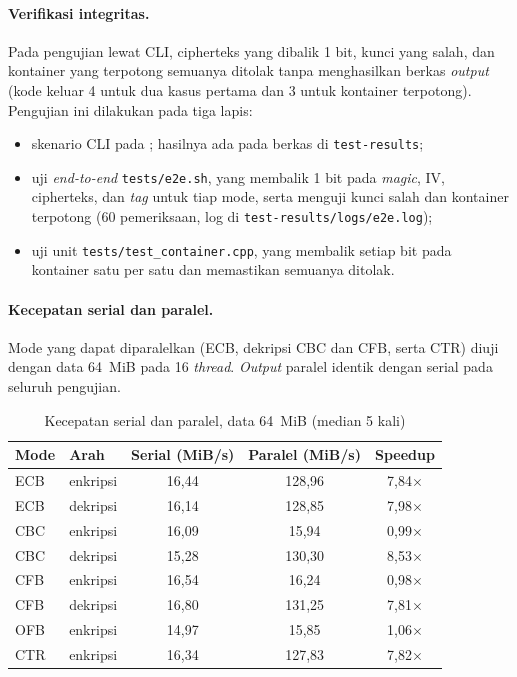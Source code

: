 \paragraph{Verifikasi integritas.} Pada pengujian lewat CLI, cipherteks yang dibalik 1 bit, kunci
yang salah, dan kontainer yang terpotong semuanya ditolak tanpa menghasilkan berkas \textit{output}
(kode keluar 4 untuk dua kasus pertama dan 3 untuk kontainer terpotong). Pengujian ini dilakukan
pada tiga lapis:
\begin{itemize}
  \item skenario CLI pada ; hasilnya ada pada berkas
     di \texttt{test-results};
  \item uji \textit{end-to-end} \texttt{tests/e2e.sh}, yang membalik 1 bit pada \textit{magic}, IV,
    cipherteks, dan \textit{tag} untuk tiap mode, serta menguji kunci salah dan kontainer terpotong
    (60 pemeriksaan, log di \texttt{test-results/logs/e2e.log});
  \item uji unit \texttt{tests/test\_container.cpp}, yang membalik setiap bit pada kontainer satu
    per satu dan memastikan semuanya ditolak.
\end{itemize}

\paragraph{Kecepatan serial dan paralel.} Mode yang dapat diparalelkan (ECB, dekripsi CBC dan CFB,
serta CTR) diuji dengan data 64~MiB pada 16 \textit{thread}. \textit{Output} paralel identik dengan serial
pada seluruh pengujian.

\begin{table}[H]
  \centering
  \caption{Kecepatan serial dan paralel, data 64~MiB (median 5 kali)}
  \begin{tabular}{llccc}
    \toprule
    Mode & Arah & Serial (MiB/s) & Paralel (MiB/s) & Speedup \\
    \midrule
    ECB & enkripsi & 16,44 & 128,96 & 7,84$\times$ \\
    ECB & dekripsi & 16,14 & 128,85 & 7,98$\times$ \\
    CBC & enkripsi & 16,09 & 15,94 & 0,99$\times$ \\
    CBC & dekripsi & 15,28 & 130,30 & 8,53$\times$ \\
    CFB & enkripsi & 16,54 & 16,24 & 0,98$\times$ \\
    CFB & dekripsi & 16,80 & 131,25 & 7,81$\times$ \\
    OFB & enkripsi & 14,97 & 15,85 & 1,06$\times$ \\
    CTR & enkripsi & 16,34 & 127,83 & 7,82$\times$ \\
    \bottomrule
  \end{tabular}
\end{table}

